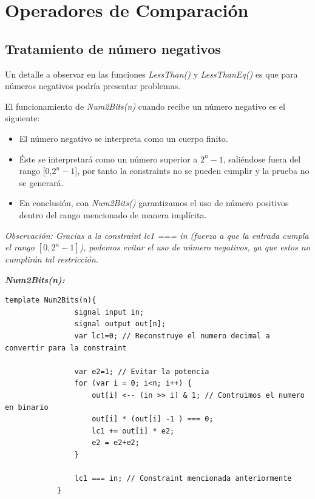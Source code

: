 \documentclass[a4paper,10pt]{article}
\begin{document}
	
		\vspace{0.2cm}
	
	
	\section{Operadores de Comparación}
	
		\subsection{Tratamiento de número negativos}
		\noindent Un detalle a observar en las funciones \textit{LessThan()} y \textit{LessThanEq()} es que para números negativos podría presentar problemas. 
		
		\vspace{0.2cm}
		
		\noindent El funcionamiento de \textit{Num2Bits(n)} cuando recibe un número negativo es el siguiente:
		
		\begin{itemize}
			\item El número negativo se interpreta como un cuerpo finito.
			
			\item Éste se interpretará como un número superior a \(2^n - 1\), saliéndose fuera del rango [0,\(2^n-1\)], por tanto la constraints no se pueden cumplir y la prueba no se generará.
			
			\item En conclusión, con \textit{Num2Bits()} garantizamos el uso de número positivos dentro del rango mencionado de manera implícita.
		\end{itemize}
		
		\noindent \textit{Observación: Gracias a la constraint lc1 === in (fuerza a que la entrada cumpla el rango \([0,2^n -1]\)), podemos evitar el uso de número negativos, ya que estos no cumplirán tal restricción.}
		
		\vspace{0.2cm}
		
		\textbf{\textit{Num2Bits(n):}}
		
		\begin{lstlisting}[language=Circom]
			template Num2Bits(n){
				signal input in;
				signal output out[n];
				var lc1=0; // Reconstruye el numero decimal a convertir para la constraint
				
				var e2=1; // Evitar la potencia
				for (var i = 0; i<n; i++) {
					out[i] <-- (in >> i) & 1; // Contruimos el numero en binario
					out[i] * (out[i] -1 ) === 0;
					lc1 += out[i] * e2;
					e2 = e2+e2;
				}
				
				lc1 === in; // Constraint mencionada anteriormente
			}
		\end{lstlisting}
		
\end{document}
